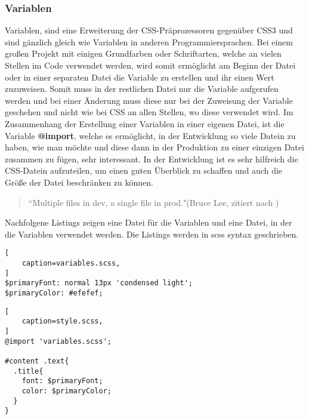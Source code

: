 \subsubsection{Variablen}
Variablen, sind eine Erweiterung der CSS-Präprozessoren gegenüber CSS3 und sind gänzlich gleich wie Variablen in anderen Programmiersprachen.
Bei einem großen Projekt mit einigen Grundfarben oder Schriftarten, welche an vielen Stellen im Code verwendet werden, wird somit ermöglicht am Beginn der Datei oder in einer separaten Datei die Variable zu erstellen und ihr einen Wert zuzuweisen. Somit muss in der restlichen Datei nur die Variable aufgerufen werden und bei einer Änderung muss diese nur bei der Zuweisung der Variable geschehen und nicht wie bei CSS an allen Stellen, wo diese verwendet wird.\autocite[]{Yard.2014} \newline
Im Zusammenhang der Erstellung einer Variablen in einer eigenen Datei, ist die Variable \textbf{@import}, welche es ermöglicht, in der Entwicklung so viele Datein zu haben, wie man möchte und diese dann in der Produktion zu einer einzigen Datei zusammen zu fügen, sehr interessant\autocite[]{Giraudel.2014}.\newline
In der Entwicklung ist es sehr hilfreich die CSS-Datein aufzuteilen, um einen guten Überblick zu schaffen und auch die Größe der Datei beschränken zu können.
\begin{quote}
``Multiple files in dev, a single file in prod."(Bruce Lee, zitiert nach \cite[]{Giraudel.2014})
\end{quote}

Nachfolgene Listings zeigen eine Datei für die Variablen und eine Datei, in der die Variablen verwendet werden. Die Listings werden in scss syntax geschrieben.
\begin{lstlisting}[
	caption=variables.scss,
]
$primaryFont: normal 13px 'condensed light';
$primaryColor: #efefef;
\end{lstlisting}
\begin{lstlisting}[
	caption=style.scss,
]
@import 'variables.scss';

#content .text{
  .title{
    font: $primaryFont;
    color: $primaryColor;
  }
}
\end{lstlisting}

